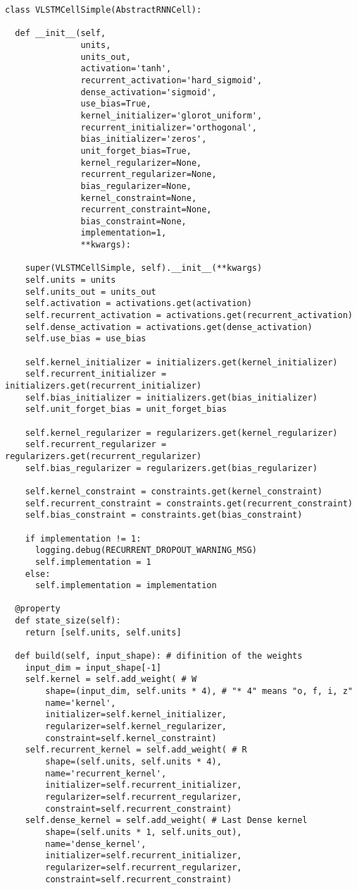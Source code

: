 \begin{lstlisting}[caption=独自のリカレントニューラルネットワーク構造の$1$ステップ, label=VLSTMCellSimple]
class VLSTMCellSimple(AbstractRNNCell):

  def __init__(self,
               units,
               units_out,
               activation='tanh',
               recurrent_activation='hard_sigmoid',
               dense_activation='sigmoid',
               use_bias=True,
               kernel_initializer='glorot_uniform',
               recurrent_initializer='orthogonal',
               bias_initializer='zeros',
               unit_forget_bias=True,
               kernel_regularizer=None,
               recurrent_regularizer=None,
               bias_regularizer=None,
               kernel_constraint=None,
               recurrent_constraint=None,
               bias_constraint=None,
               implementation=1,
               **kwargs):

    super(VLSTMCellSimple, self).__init__(**kwargs)
    self.units = units
    self.units_out = units_out
    self.activation = activations.get(activation)
    self.recurrent_activation = activations.get(recurrent_activation)
    self.dense_activation = activations.get(dense_activation)
    self.use_bias = use_bias

    self.kernel_initializer = initializers.get(kernel_initializer)
    self.recurrent_initializer = initializers.get(recurrent_initializer)
    self.bias_initializer = initializers.get(bias_initializer)
    self.unit_forget_bias = unit_forget_bias

    self.kernel_regularizer = regularizers.get(kernel_regularizer)
    self.recurrent_regularizer = regularizers.get(recurrent_regularizer)
    self.bias_regularizer = regularizers.get(bias_regularizer)

    self.kernel_constraint = constraints.get(kernel_constraint)
    self.recurrent_constraint = constraints.get(recurrent_constraint)
    self.bias_constraint = constraints.get(bias_constraint)

    if implementation != 1:
      logging.debug(RECURRENT_DROPOUT_WARNING_MSG)
      self.implementation = 1
    else:
      self.implementation = implementation

  @property
  def state_size(self):
    return [self.units, self.units]

  def build(self, input_shape): # difinition of the weights
    input_dim = input_shape[-1]
    self.kernel = self.add_weight( # W
        shape=(input_dim, self.units * 4), # "* 4" means "o, f, i, z"
        name='kernel',
        initializer=self.kernel_initializer,
        regularizer=self.kernel_regularizer,
        constraint=self.kernel_constraint)
    self.recurrent_kernel = self.add_weight( # R
        shape=(self.units, self.units * 4),
        name='recurrent_kernel',
        initializer=self.recurrent_initializer,
        regularizer=self.recurrent_regularizer,
        constraint=self.recurrent_constraint)
    self.dense_kernel = self.add_weight( # Last Dense kernel
        shape=(self.units * 1, self.units_out),
        name='dense_kernel',
        initializer=self.recurrent_initializer,
        regularizer=self.recurrent_regularizer,
        constraint=self.recurrent_constraint)


\end{lstlisting}
